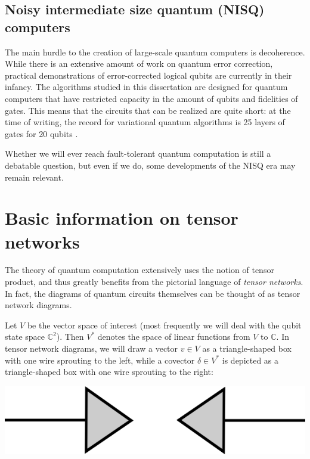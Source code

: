 \subsection{Noisy intermediate size quantum (NISQ) computers}

The main hurdle to the creation of large-scale quantum computers is decoherence. While there is an extensive amount of work on quantum error correction, practical demonstrations of error-corrected logical qubits are currently in their infancy. The algorithms studied in this dissertation are designed for quantum computers that have restricted capacity in the amount of qubits and fidelities of gates. This means that the circuits that can be realized are quite short: at the time of writing, the record for variational quantum algorithms is 25 layers of gates for 20 qubits \cite{rosenberg_experimental_2021}. 

Whether we will ever reach fault-tolerant quantum computation is still a debatable question, but even if we do, some developments of the NISQ era may remain relevant.

\section{Basic information on tensor networks}

The theory of quantum computation extensively uses the notion of tensor product, and thus greatly benefits from the pictorial language of \textit{tensor networks}. In fact, the diagrams of quantum circuits themselves can be thought of as tensor network diagrams.

Let $V$ be the vector space of interest (most frequently we will deal with the qubit state space $\mathbb{C}^2$). Then $V^*$ denotes the space of linear functions from $V$ to $\mathbb{C}$. In tensor network diagrams, we will draw a vector $v \in V$ as a triangle-shaped box with one wire sprouting to the left, while a covector $\delta \in V^*$ is depicted as a triangle-shaped box with one wire sprouting to the right:

\begin{center}
    \includegraphics{figures/inkscape/path4585}
\end{center}


